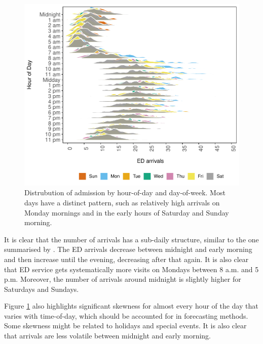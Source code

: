 \documentclass[]{elsarticle} %
\begin{document}
\begin{figure}[H]

{\centering \includegraphics{paper_files/figure-latex/hourly-plot-ridge-1} 

}

\caption{Distrubution of admission by hour-of-day and day-of-week. Most days have a distinct pattern, such as relatively high arrivals on Monday mornings and in the early hours of Saturday and Sunday morning.}\label{fig:hourly-plot-ridge}
\end{figure}

It is clear that the number of arrivals has a sub-daily structure,
similar to the one summarised by \citet{hertzum2017forecasting}. The ED
arrivals decrease between midnight and early morning and then increase
until the evening, decreasing after that again. It is also clear that ED
service gets systematically more visits on Mondays between 8 a.m. and 5
p.m. Moreover, the number of arrivals around midnight is slightly higher
for Saturdays and Sundays.

Figure \ref{fig:hourly-plot-ridge} also highlights significant skewness
for almost every hour of the day that varies with time-of-day, which
should be accounted for in forecasting methods. Some skewness might be
related to holidays and special events. It is also clear that arrivals
are less volatile between midnight and early morning.
\end{document}
